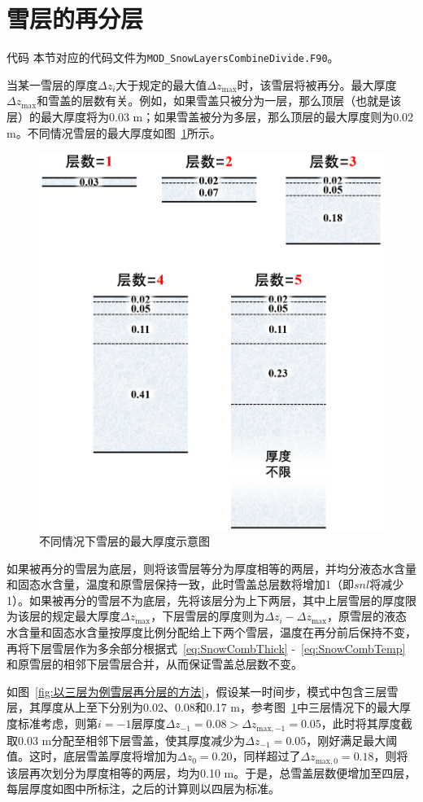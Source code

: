\section{雪层的再分层}\label{雪层的再分层}
\begin{mymdframed}{代码}
  本节对应的代码文件为\texttt{MOD\_SnowLayersCombineDivide.F90}。
\end{mymdframed}
当某一雪层的厚度$\Delta z_i$大于规定的最大值$\Delta z_{\mathrm{max}}$时，该雪层将被再分。最大厚度$\Delta z_{\mathrm{max}}$和雪盖的层数有关。例如，如果雪盖只被分为一层，那么顶层（也就是该层）的最大厚度将为0.03 \unit{m}；如果雪盖被分为多层，那么顶层的最大厚度则为0.02 \unit{m}。不同情况雪层的最大厚度如图~\ref{fig:不同情况下雪层的最大厚度}所示。

{
  \begin{figure}[htbp]
    \centering
    \includegraphics[width=0.6\columnwidth]{Figures/雪盖土壤热力过程/不同情况下雪层的最大厚度.png}
    \caption{不同情况下雪层的最大厚度示意图}
    \label{fig:不同情况下雪层的最大厚度}
  \end{figure}
}

如果被再分的雪层为底层，则将该雪层等分为厚度相等的两层，并均分液态水含量和固态水含量，温度和原雪层保持一致，此时雪盖总层数将增加1（即$snl$将减少1）。如果被再分的雪层不为底层，先将该层分为上下两层，其中上层雪层的厚度限为该层的规定最大厚度$\Delta z_{\mathrm{max}}$，下层雪层的厚度则为$\Delta z_i - \Delta z_{\mathrm{max}}$，原雪层的液态水含量和固态水含量按厚度比例分配给上下两个雪层，温度在再分前后保持不变，再将下层雪层作为多余部分根据式~\eqref{eq:SnowCombThick} -~\eqref{eq:SnowCombTemp}和原雪层的相邻下层雪层合并，从而保证雪盖总层数不变。

如图~\ref{fig:以三层为例雪层再分层的方法}，假设某一时间步，模式中包含三层雪层，其厚度从上至下分别为0.02、0.08和0.17 m，参考图~\ref{fig:不同情况下雪层的最大厚度}中三层情况下的最大厚度标准考虑，则第$i=-1$层厚度$\Delta z_{-1}=0.08 > \Delta z_{\mathrm{max,-1}}=0.05 $，此时将其厚度截取0.03 m分配至相邻下层雪盖，使其厚度减少为$\Delta z_{-1}=0.05$，刚好满足最大阈值。这时，底层雪盖厚度将增加为$\Delta z_{0}=0.20$，同样超过了$\Delta z_{\mathrm{max,0}}=0.18$，则将该层再次划分为厚度相等的两层，均为0.10 m。于是，总雪盖层数便增加至四层，每层厚度如图中所标注，之后的计算则以四层为标准。

